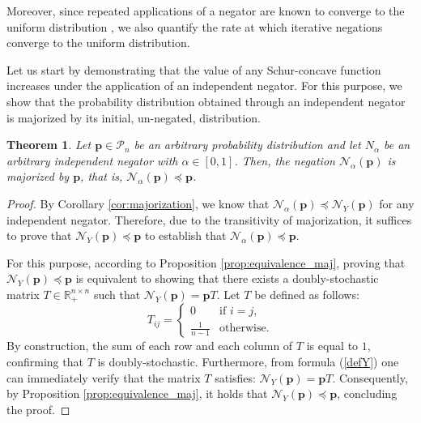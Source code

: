 \documentclass[pdflatex,sn-basic,iicol]{sn-jnl}%
\theoremstyle{thmstyleone}%
\newtheorem{theorem}{Theorem}%
\theoremstyle{thmstyletwo}%
\theoremstyle{thmstylethree}%
\newcommand{\N}{\mathcal{N}}
\newcommand{\cP}{\mathcal{P}}
\newcommand{\bp}{\mathbf{p}}
\begin{document}
Moreover, since repeated applications of a negator are known to converge to the uniform distribution \citep{generating,Yager2015},  we also quantify  the rate at which iterative negations converge to the uniform distribution.%


Let us start by demonstrating that the value of any Schur-concave function increases under the application of an independent negator. For this purpose, we show that the probability distribution obtained through an independent negator is majorized by its initial, un-negated,  distribution.

\begin{theorem}\label{th:p_maj_N}
    Let $\bp\in \cP_n$ be an arbitrary probability distribution and let $N_{\alpha}$ be an arbitrary independent negator with $\alpha\in[0,1]$. Then,  the negation $\N_\alpha(\bp)$ is majorized by $\bp$, that is,  $\N_{\alpha}(\bp) \preceq \bp$.
\end{theorem}
\begin{proof}
    By Corollary \ref{cor:majorization}, we know that $\N_\alpha(\bp)\preceq \N_Y(\bp)$ for any independent negator. Therefore, due to the transitivity of majorization, it suffices to prove that $\N_{Y}(\bp) \preceq \bp$ to establish that  $\N_{\alpha}(\bp) \preceq \bp$.

    For this purpose, according to Proposition \ref{prop:equivalence_maj}, proving that $\N_Y(\bp) \preceq \bp$ is equivalent to showing that there exists a doubly-stochastic matrix $T\in\mathbb{R}_+^{n\times n}$ such that $\N_Y(\bp)=\bp T$. Let $T$ be defined as follows:
    \begin{equation}
    T_{ij} = 
    \begin{cases}
        0 &\text{if } i=j,\\
        \frac{1}{n-1} &\text{otherwise.}
    \end{cases}
\end{equation}
    By construction, the sum of each row and each column of $T$ is equal to $1$, confirming that $T$ is doubly-stochastic. Furthermore, 
    from formula (\ref{defY}) one can immediately verify that the matrix $T$ satisfies: $\N_Y(\bp) = \bp T$. Consequently, by Proposition \ref{prop:equivalence_maj}, it holds that $\N_Y(\bp)\preceq \bp$, concluding the proof.
\end{proof}
\end{document}
